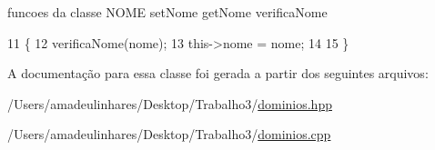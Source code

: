 funcoes da classe N\+O\+ME set\+Nome get\+Nome verifica\+Nome 
\begin{DoxyCode}
11 \{
12     verificaNome(nome);
13     this->nome = nome;
14 
15 \}
\end{DoxyCode}


A documentação para essa classe foi gerada a partir dos seguintes arquivos\+:\begin{DoxyCompactItemize}
\item 
/\+Users/amadeulinhares/\+Desktop/\+Trabalho3/\mbox{\hyperlink{dominios_8hpp}{dominios.\+hpp}}\item 
/\+Users/amadeulinhares/\+Desktop/\+Trabalho3/\mbox{\hyperlink{dominios_8cpp}{dominios.\+cpp}}\end{DoxyCompactItemize}
